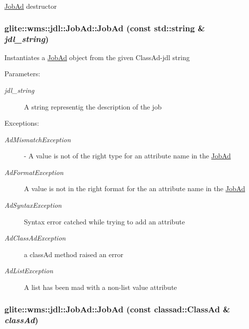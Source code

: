 \hyperlink{classglite_1_1wms_1_1jdl_1_1JobAd}{Job\-Ad} destructor \hypertarget{classglite_1_1wms_1_1jdl_1_1JobAd_z1_2}{
\subsubsection[JobAd]{\setlength{\rightskip}{0pt plus 5cm}glite::wms::jdl::Job\-Ad::Job\-Ad (const std::string \& {\em jdl\_\-string})}}
\label{classglite_1_1wms_1_1jdl_1_1JobAd_z1_2}


Instantiates a \hyperlink{classglite_1_1wms_1_1jdl_1_1JobAd}{Job\-Ad} object from the given Class\-Ad-jdl string \begin{Desc}
\item[Parameters:]
\begin{description}
\item[{\em jdl\_\-string}]A string representig the description of the job \end{description}
\end{Desc}
\begin{Desc}
\item[Exceptions:]
\begin{description}
\item[{\em Ad\-Mismatch\-Exception}]- A value is not of the right type for an attribute name in the \hyperlink{classglite_1_1wms_1_1jdl_1_1JobAd}{Job\-Ad} \item[{\em Ad\-Format\-Exception}]A value is not in the right format for the an attribute name in the \hyperlink{classglite_1_1wms_1_1jdl_1_1JobAd}{Job\-Ad} \item[{\em Ad\-Syntax\-Exception}]Syntax error catched while trying to add an attribute \item[{\em Ad\-Class\-Ad\-Exception}]a class\-Ad method raised an error \item[{\em Ad\-List\-Exception}]A list has been mad with a non-list value attribute \end{description}
\end{Desc}
\hypertarget{classglite_1_1wms_1_1jdl_1_1JobAd_z1_3}{
\subsubsection[JobAd]{\setlength{\rightskip}{0pt plus 5cm}glite::wms::jdl::Job\-Ad::Job\-Ad (const classad::Class\-Ad \& {\em class\-Ad})}}
\label{classglite_1_1wms_1_1jdl_1_1JobAd_z1_3}


